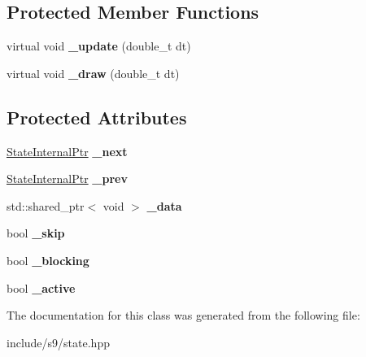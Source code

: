 \subsection*{Protected Member Functions}
\begin{DoxyCompactItemize}
\item 
\hypertarget{classs9_1_1State_a0d4e78ab84765021a534b8fb6dcc5497}{virtual void {\bfseries \-\_\-update} (double\-\_\-t dt)}\label{classs9_1_1State_a0d4e78ab84765021a534b8fb6dcc5497}

\item 
\hypertarget{classs9_1_1State_a1d85c69d1c6be10a66fef1322ec6866e}{virtual void {\bfseries \-\_\-draw} (double\-\_\-t dt)}\label{classs9_1_1State_a1d85c69d1c6be10a66fef1322ec6866e}

\end{DoxyCompactItemize}
\subsection*{Protected Attributes}
\begin{DoxyCompactItemize}
\item 
\hypertarget{classs9_1_1State_aaeb51975049bf02a4b32c7fdf9f4b816}{\hyperlink{classs9_1_1State}{State\-Internal\-Ptr} {\bfseries \-\_\-next}}\label{classs9_1_1State_aaeb51975049bf02a4b32c7fdf9f4b816}

\item 
\hypertarget{classs9_1_1State_a650c0737d8dce6939b36a680690a1d02}{\hyperlink{classs9_1_1State}{State\-Internal\-Ptr} {\bfseries \-\_\-prev}}\label{classs9_1_1State_a650c0737d8dce6939b36a680690a1d02}

\item 
\hypertarget{classs9_1_1State_ae9a215471150db3a80b843fabc80ce7c}{std\-::shared\-\_\-ptr$<$ void $>$ {\bfseries \-\_\-data}}\label{classs9_1_1State_ae9a215471150db3a80b843fabc80ce7c}

\item 
\hypertarget{classs9_1_1State_af619a178ddde7b8648838300d4632760}{bool {\bfseries \-\_\-skip}}\label{classs9_1_1State_af619a178ddde7b8648838300d4632760}

\item 
\hypertarget{classs9_1_1State_a7ada53c70cb3e8b7ea20250733ae89ef}{bool {\bfseries \-\_\-blocking}}\label{classs9_1_1State_a7ada53c70cb3e8b7ea20250733ae89ef}

\item 
\hypertarget{classs9_1_1State_a1a28bd0613dfe3ee349999a3b1f57dd0}{bool {\bfseries \-\_\-active}}\label{classs9_1_1State_a1a28bd0613dfe3ee349999a3b1f57dd0}

\end{DoxyCompactItemize}


The documentation for this class was generated from the following file\-:\begin{DoxyCompactItemize}
\item 
include/s9/state.\-hpp\end{DoxyCompactItemize}
